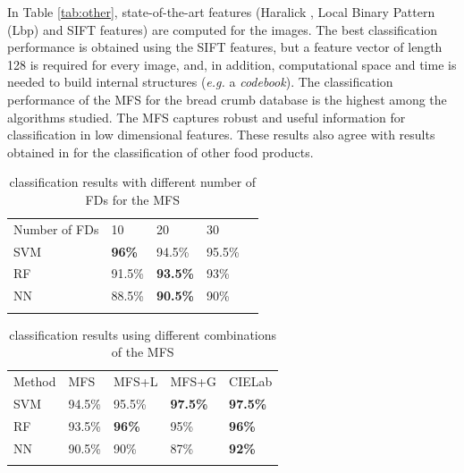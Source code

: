 In Table \ref{tab:other}, state-of-the-art features (Haralick \cite{Haralick73}, Local Binary Pattern (Lbp) \cite{Ojala96} and SIFT \cite{Lowe2004} features) are computed for the images. The best classification performance is obtained using the SIFT features, but a feature vector of length 128 is required for every image, and, in addition, computational space and time is needed to build internal structures ({\em e.g.} a {\em codebook}). The classification performance of the MFS for the bread crumb database is the highest among the algorithms studied. The MFS captures robust and useful information for classification in low dimensional features. These results also agree with results obtained in \cite{Bosch2011} for the classification of other food products.

\begin{table}
\caption{classification results with different number of FDs for the MFS}
\label{tab:number}       %
\begin{tabular}{lllll}
\hline\noalign{\smallskip}
Number of FDs & 10  & 20 & 30 \\
\noalign{\smallskip}\hline\noalign{\smallskip}
SVM & \textbf{96\%} & 94.5\% & 95.5\% \\
RF  & 91.5\% & \textbf{93.5\%} & 93\% \\
NN & 88.5\% & \textbf{90.5\%} & 90\% \\
\noalign{\smallskip}\hline
\end{tabular}
\end{table}


\begin{table}
\caption{classification results using different combinations of the MFS}
\label{tab:mfs}       %
\begin{tabular}{lllll}
\hline\noalign{\smallskip}
Method & MFS & MFS+L & MFS+G & CIELab  \\
\noalign{\smallskip}\hline\noalign{\smallskip}
SVM & 94.5\% & 95.5\% & \textbf{97.5\%} & \textbf{97.5\%} \\
RF  & 93.5\% & \textbf{96\%} & 95\% & \textbf{96\%} \\
NN & 90.5\% & 90\% & 87\% & \textbf{92\%} \\
\noalign{\smallskip}\hline
\end{tabular}
\end{table}


